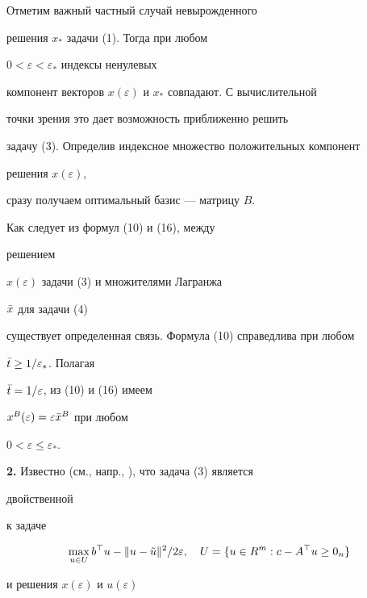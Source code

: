 \begin{note} Отметим важный частный случай невырожденного


решения $x_*$ задачи (1). Тогда при любом


$0<\varepsilon<\varepsilon_*$ индексы ненулевых


компонент векторов $x(\varepsilon)$ и $x_*$ совпадают. С вычислительной


точки зрения это дает возможность приближенно решить


задачу (3). Определив индексное множество положительных компонент


решения $x(\varepsilon)$,


сразу получаем оптимальный базис --- матрицу $B$.


\end{note}





\begin{note} Как следует из формул (10) и (16), между


решением


$x(\varepsilon)$ задачи (3) и множителями Лагранжа


$\Bar x$ для задачи (4)


существует определенная связь. Формула (10) справедлива при любом


$\Bar t\ge 1/\varepsilon_*$. Полагая


$\Bar t=1/\varepsilon$, из (10) и (16) имеем


$x^B(\varepsilon)=\varepsilon\Bar x^B$ при любом


$0<\varepsilon\le\varepsilon_*$.


\end{note}





{\bf 2.} Известно (см., напр., \cite{Pol1}), что задача (3) является


двойственной


к задаче


\begin{equation}


\max_{u\in U}b^\top u-\|u-\Tilde u\|^2/2\varepsilon,\quad


U=\{u\in R^m:c-A^\top u\ge 0_n\}


\end{equation}


и решения $x(\varepsilon)$ и $u(\varepsilon)$


